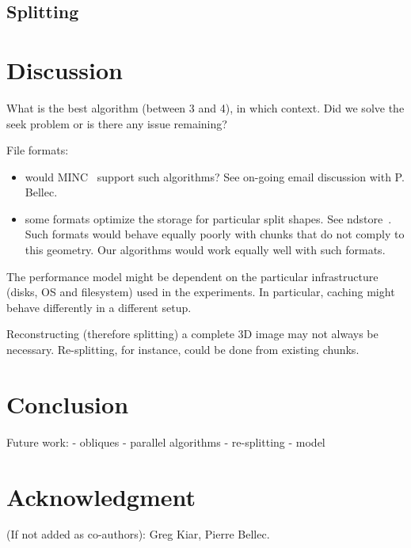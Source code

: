 \documentclass[10pt, conference, compsocconf]{IEEEtran}
\begin{document}
\subsection{Splitting}


\section{Discussion}
\label{sec:discussion}

What is the best algorithm (between 3 and 4), in which context. Did we
solve the seek problem or is there any issue remaining?

File formats:
\begin{itemize}
\item would MINC~\cite{vincent2016minc} support such algorithms? See on-going email discussion
with P. Bellec.
\item some formats optimize the storage for particular split shapes. See
  ndstore~\cite{burns2013open}. Such formats would behave equally
  poorly with chunks that do not comply to this geometry. Our
  algorithms would work equally well with such formats.
\end{itemize}

The performance model might be dependent on the particular
infrastructure (disks, OS and filesystem) used in the experiments. In
particular, caching might behave differently in a different setup.

Reconstructing (therefore splitting) a complete 3D image may not
always be necessary. Re-splitting, for instance, could be done from
existing chunks.

\section{Conclusion}

Future work:
- obliques
- parallel algorithms
- re-splitting
- model

\section*{Acknowledgment}

(If not added as co-authors): Greg Kiar, Pierre Bellec.



\end{document}
